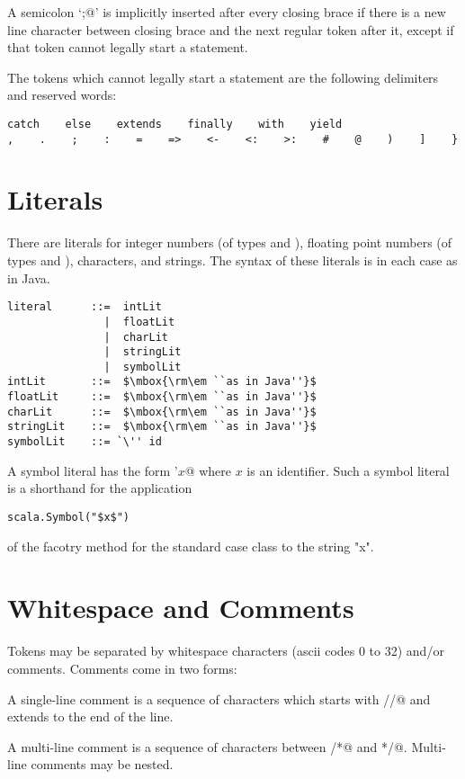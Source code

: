 \documentclass[a4paper,12pt,twoside,titlepage]{book}
\begin{document}
A semicolon `\lstinline@;@' is implicitly inserted after every closing brace
if there is a new line character between closing brace and the next
regular token after it, except if that token cannot legally start a
statement.

The tokens which cannot legally start a statement
are the following delimiters and reserved words:
\begin{lstlisting}
catch    else    extends    finally    with    yield
,    .    ;    :    =    =>    <-    <:    >:    #    @    )    ]    }
\end{lstlisting}

\section{Literals}

There are literals for integer numbers (of types  and ),
floating point numbers (of types  and ), characters, and
strings.  The syntax of these literals is in each case as in Java.

\syntax\begin{lstlisting}
literal      ::=  intLit
               |  floatLit
               |  charLit
               |  stringLit
               |  symbolLit
intLit       ::=  $\mbox{\rm\em ``as in Java''}$
floatLit     ::=  $\mbox{\rm\em ``as in Java''}$
charLit      ::=  $\mbox{\rm\em ``as in Java''}$
stringLit    ::=  $\mbox{\rm\em ``as in Java''}$
symbolLit    ::= `\'' id
\end{lstlisting}

A symbol literal has the form \lstinline@'$x$@ where $x$ is an identifier.
Such a symbol literal is a  shorthand for the application
\begin{lstlisting}
scala.Symbol("$x$")
\end{lstlisting}
of the facotry method for the standard case class  to the string "x".

\section{Whitespace and Comments}

Tokens may be separated by whitespace characters (ascii codes 0 to 32)
and/or comments. Comments come in two forms:

A single-line comment is a sequence of characters which starts with
\lstinline@//@ and extends to the end of the line.

A multi-line comment is a sequence of characters between \lstinline@/*@ and
\lstinline@*/@. Multi-line comments may be nested.
\end{document}
